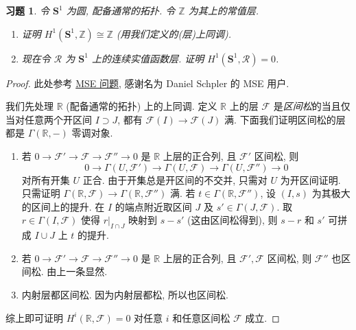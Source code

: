 \documentclass{article}
\theoremstyle{exercise}
\newtheorem{exercise}{习题}[section]
\theoremstyle{theorem}
\theoremstyle{remark}
\def\Z{\mathbb{Z}}
\def\R{\mathbb{R}}
\def\bS{\mathbf{S}}
\def\cF{\mathscr{F}}
\def\cR{\mathscr{R}}
\begin{document}
\begin{exercise}
  令 $\bS^1$ 为圆, 配备通常的拓扑. 令 $\Z$ 为其上的常值层.
  \begin{enumerate}[label=(\arabic*)]
    \item 证明 $H^1(\bS^1, \Z) \cong \Z$ (用我们定义的(层)上同调).
    \item 现在令 $\cR$ 为 $\bS^1$ 上的连续实值函数层. 证明 $H^1(\bS^1, \cR) = 0$.
  \end{enumerate}
\end{exercise}

\begin{proof}
  此处参考 \href{https://math.stackexchange.com/questions/2801221/why-does-the-sheaf-cohomology-of-the-constant-sheaf-on-mathbbr-vanish}{MSE 问题},
  感谢名为 Daniel Schpler 的 MSE 用户.

  我们先处理 $\R$ (配备通常的拓扑) 上的上同调.
  定义 $\R$ 上的层 $\cF$ 是\emph{区间松}的当且仅当对任意两个开区间 $I \supset J$, 都有 $\cF(I) \to \cF(J)$ 满.
  下面我们证明区间松的层都是 $\Gamma(\R, -)$ 零调对象.
  \begin{enumerate}
    \item 若 $0 \to \cF' \to \cF \to \cF'' \to 0$ 是 $\R$ 上层的正合列, 且 $\cF'$ 区间松, 则
          \[
          0 \to \Gamma(U, \cF') \to \Gamma(U, \cF) \to \Gamma(U, \cF'') \to 0
          \]
          对所有开集 $U$ 正合. 由于开集总是开区间的不交并, 只需对 $U$ 为开区间证明.
          只需证明 $\Gamma(\R, \cF) \to \Gamma(\R, \cF'')$ 满.
          若 $t \in \Gamma(\R, \cF'')$, 设 $(I, s)$ 为其极大的区间上的提升.
          在 $I$ 的端点附近取区间 $J$ 及 $s' \in \Gamma(J, \cF)$.
          取 $r \in \Gamma(I, \cF)$ 使得 $r|_{I \cap J}$ 映射到 $s - s'$ (这由区间松得到),
          则 $s - r$ 和 $s'$ 可拼成 $I \cup J$ 上 $t$ 的提升.
    \item 若 $0 \to \cF' \to \cF \to \cF'' \to 0$ 是 $\R$ 上层的正合列, 且 $\cF', \cF$ 区间松,
          则 $\cF''$ 也区间松. 由上一条显然.
    \item 内射层都区间松. 因为内射层都松, 所以也区间松.
  \end{enumerate}
  综上即可证明 $H^i(\R, \cF) = 0$ 对任意 $i$ 和任意区间松 $\cF$ 成立.


\end{proof}
\end{document}
